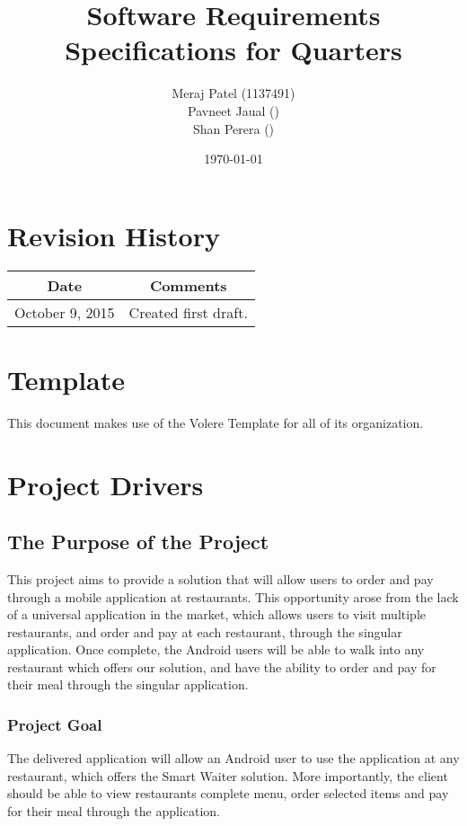 \documentclass[12pt, titlepage]{article}
\begin{document}
\title{Software Requirements Specifications for Quarters} 
\author{Meraj Patel (1137491)\\ Pavneet Jaual ()\\ Shan Perera ()}
\date{\today}
\maketitle

\tableofcontents 
\listoffigures
\listoftables

\section*{Revision History}
\begin{tabular}{|c|c|}
\hline
\textbf{Date}  & \textbf{Comments} \\ \hline
October 9, 2015 & Created first draft. \\ 
\hline
\end{tabular}

\section*{Template}
This document makes use of the Volere Template for all of its organization.


\section{Project Drivers}

\subsection{The Purpose of the Project}
This project aims to provide a solution that will allow users to order and pay through a mobile application at restaurants. This opportunity arose from the lack of a universal application in the market, which allows users to visit multiple restaurants, and order and pay at each restaurant, through the singular application. Once complete, the Android users will be able to walk into any restaurant which offers our solution, and have the ability to order and pay for their meal through the singular application.
\subsubsection{Project Goal}
The delivered application will allow an Android user to use the application at any restaurant, which offers the Smart Waiter solution.  More importantly, the client should be able to view restaurants complete menu, order selected items and pay for their meal through the application. 
\end{document}
